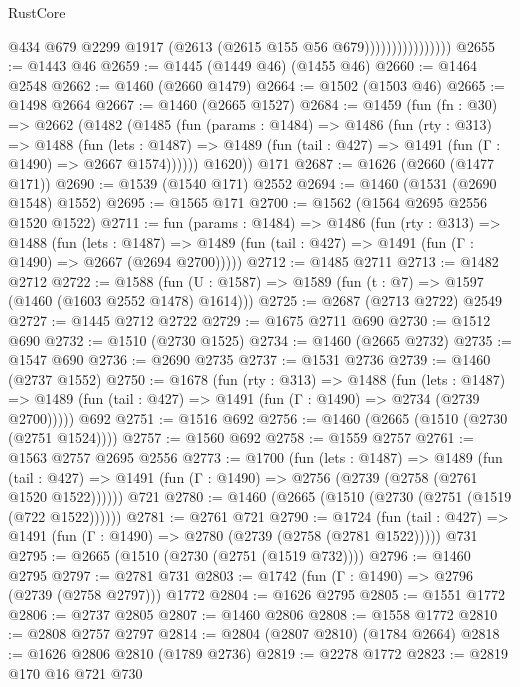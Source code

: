 \begin{lexlean}{RustCore}
\begin{coremodule}
                                @434
                                @679
                                @2299
                                @1917
                                (@2613 (@2615 @155 @56 @679))))))))))))))))
@2655 := @1443 @46
@2659 := @1445 (@1449 @46) (@1455 @46)
@2660 := @1464 @2548
@2662 := @1460 (@2660 @1479)
@2664 := @1502 (@1503 @46)
@2665 := @1498 @2664
@2667 := @1460 (@2665 @1527)
@2684 := @1459
    (fun (fn : @30) =>
    @2662
      (@1482
        (@1485
          (fun (params : @1484) =>
          @1486
            (fun (rty : @313) =>
            @1488
              (fun (lets : @1487) =>
              @1489 (fun (tail : @427) => @1491 (fun (Γ : @1490) => @2667 @1574))))))
        @1620))
    @171
@2687 := @1626 (@2660 (@1477 @171))
@2690 := @1539 (@1540 @171) @2552
@2694 := @1460 (@1531 (@2690 @1548) @1552)
@2695 := @1565 @171
@2700 := @1562 (@1564 @2695 @2556 @1520 @1522)
@2711 := fun (params : @1484) =>
  @1486
    (fun (rty : @313) =>
    @1488
      (fun (lets : @1487) =>
      @1489 (fun (tail : @427) => @1491 (fun (Γ : @1490) => @2667 (@2694 @2700)))))
@2712 := @1485 @2711
@2713 := @1482 @2712
@2722 := @1588 (fun (U : @1587) => @1589 (fun (t : @7) => @1597 (@1460 (@1603 @2552 @1478) @1614)))
@2725 := @2687 (@2713 @2722) @2549
@2727 := @1445 @2712 @2722
@2729 := @1675 @2711 @690
@2730 := @1512 @690
@2732 := @1510 (@2730 @1525)
@2734 := @1460 (@2665 @2732)
@2735 := @1547 @690
@2736 := @2690 @2735
@2737 := @1531 @2736
@2739 := @1460 (@2737 @1552)
@2750 := @1678
    (fun (rty : @313) =>
    @1488
      (fun (lets : @1487) =>
      @1489 (fun (tail : @427) => @1491 (fun (Γ : @1490) => @2734 (@2739 @2700)))))
    @692
@2751 := @1516 @692
@2756 := @1460 (@2665 (@1510 (@2730 (@2751 @1524))))
@2757 := @1560 @692
@2758 := @1559 @2757
@2761 := @1563 @2757 @2695 @2556
@2773 := @1700
    (fun (lets : @1487) =>
    @1489
      (fun (tail : @427) => @1491 (fun (Γ : @1490) => @2756 (@2739 (@2758 (@2761 @1520 @1522))))))
    @721
@2780 := @1460 (@2665 (@1510 (@2730 (@2751 (@1519 (@722 @1522))))))
@2781 := @2761 @721
@2790 := @1724
    (fun (tail : @427) => @1491 (fun (Γ : @1490) => @2780 (@2739 (@2758 (@2781 @1522)))))
    @731
@2795 := @2665 (@1510 (@2730 (@2751 (@1519 @732))))
@2796 := @1460 @2795
@2797 := @2781 @731
@2803 := @1742 (fun (Γ : @1490) => @2796 (@2739 (@2758 @2797))) @1772
@2804 := @1626 @2795
@2805 := @1551 @1772
@2806 := @2737 @2805
@2807 := @1460 @2806
@2808 := @1558 @1772
@2810 := @2808 @2757 @2797
@2814 := @2804 (@2807 @2810) (@1784 @2664)
@2818 := @1626 @2806 @2810 (@1789 @2736)
@2819 := @2278 @1772
@2823 := @2819 @170 @16 @721 @730

\end{coremodule}
\end{lexlean}
